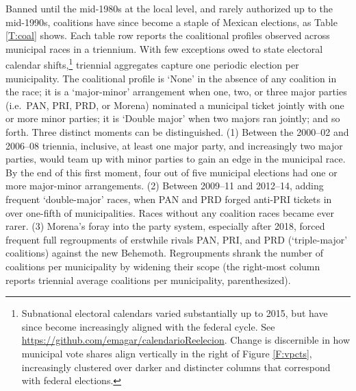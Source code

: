 \documentclass[letter,12pt]{article}
\begin{document}
Banned until the mid-1980s at the local level, and rarely authorized up to the mid-1990s, coalitions have since become a staple of Mexican elections, as Table \ref{T:coal} shows. Each table row reports the coalitional profiles observed across municipal races in a triennium. With few exceptions owed to state electoral calendar shifts,\footnote{Subnational electoral calendars varied substantially up to 2015, but have since become increasingly aligned with the federal cycle. See \url{https://github.com/emagar/calendarioReelecion}. Change is discernible in how municipal vote shares align vertically in the right of Figure \ref{F:vpcts}, increasingly clustered over darker and distincter columns that correspond with federal elections.} triennial aggregates capture one periodic election per municipality. The coalitional profile is `None' in the absence of any coalition in the race; it is a `major-minor' arrangement when one, two, or three major parties (i.e.\ PAN, PRI, PRD, or Morena) nominated a municipal ticket jointly with one or more minor parties; it is `Double major' when two majors ran jointly; and so forth. Three distinct moments can be distinguished. (1) Between the 2000--02 and 2006--08 triennia, inclusive, at least one major party, and increasingly two major parties, would team up with minor parties to gain an edge in the municipal race. By the end of this first moment, four out of five municipal elections had one or more major-minor arrangements. (2) Between 2009--11 and 2012--14, adding frequent `double-major' races, when PAN and PRD forged anti-PRI tickets in over one-fifth of municipalities. Races without any coalition races became ever rarer. (3) Morena's foray into the party system, especially after 2018, forced frequent full regroupments of erstwhile rivals PAN, PRI, and PRD (`triple-major' coalitions) against the new Behemoth. Regroupments shrank the number of coalitions per municipality by widening their scope (the right-most column reports triennial average coalitions per municipality, parenthesized).

\end{document}
